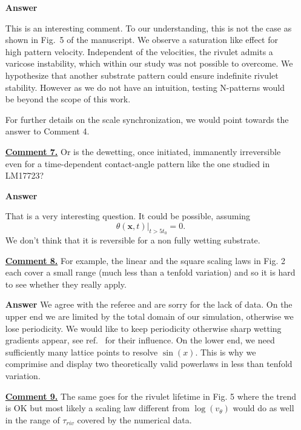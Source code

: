 \documentclass[12pt,english]{article}
\begin{document}
\begin{itemize}
\item[ \textbf{{Answer}}]
{ 
This is an interesting comment.
To our understanding, this is not the case as shown in Fig.~5 of the manuscript.
We observe a saturation like effect for high pattern velocity.
Independent of the velocities, the rivulet admits a varicose instability, which within our study was not possible to overcome.
We hypothesize that another substrate pattern could ensure indefinite rivulet stability.
However as we do not have an intuition, testing N-patterns would be beyond the scope of this work.

For further details on the scale synchronization, we would point towards the answer to Comment 4.
}

\item[ \textbf{\underline{Comment 7.}}]
{ 
Or is the dewetting, once initiated, immanently irreversible even for a time-dependent contact-angle pattern like the one studied in LM17723?
}

\item[ \textbf{{Answer}}]
{ 
That is a very interesting question.
It could be possible, assuming
\begin{equation*}
    \theta(\mathbf{x},t)|_{t > 5t_0} = 0.    
\end{equation*}
We don't think that it is reversible for a non fully wetting substrate.

}

\item[ \textbf{\underline{Comment 8.}}]
{ 
For example, the linear and the square scaling laws in Fig. 2 each cover a small range (much less than a tenfold variation) and so it is hard to see whether they really apply.
}

\item[ \textbf{{Answer}}]
{ 
We agree with the referee and are sorry for the lack of data.
On the upper end we are limited by the total domain of our simulation, otherwise we lose periodicity.
We would like to keep periodicity otherwise sharp wetting gradients appear, see ref.~\cite{PhysRevE.104.034801} for their influence.
On the lower end, we need sufficiently many lattice points to resolve $\sin(x)$.
This is why we comprimise and display two theoretically valid powerlaws in less than tenfold variation.
}

\item[ \textbf{\underline{Comment 9.}}]
{ 
The same goes for the rivulet lifetime in Fig. 5 where the trend is OK but most likely a scaling law different from $\log(v_{\theta})$ would do as well in the range of $\tau_{riv}$ covered by the numerical data.
}


\end{itemize}
\end{document}

